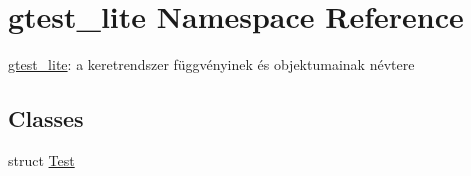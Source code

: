 \hypertarget{namespacegtest__lite}{}\section{gtest\+\_\+lite Namespace Reference}
\label{namespacegtest__lite}


\hyperlink{namespacegtest__lite}{gtest\+\_\+lite}\+: a keretrendszer függvényinek és objektumainak névtere  


\subsection*{Classes}
\begin{DoxyCompactItemize}
\item 
struct \hyperlink{structgtest__lite_1_1_test}{Test}
\end{DoxyCompactItemize}
